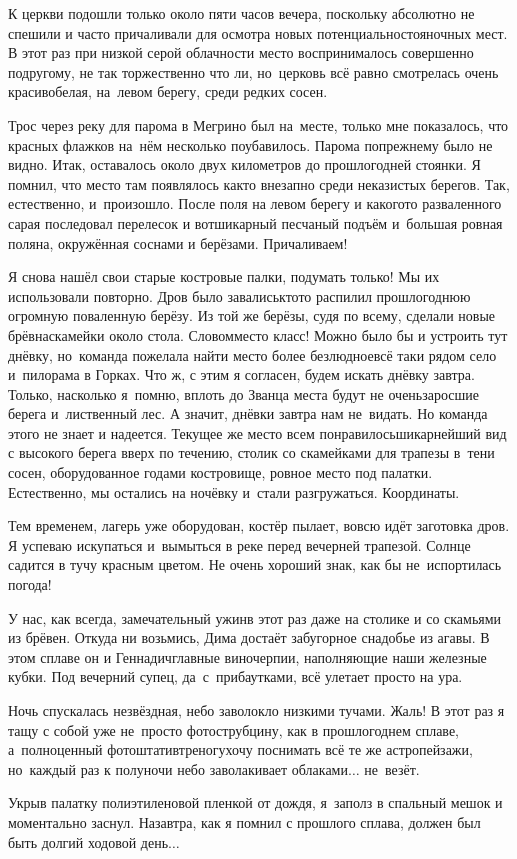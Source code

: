 К церкви подошли только около пяти часов вечера, поскольку абсолютно не спешили и часто причаливали для осмотра новых потенциально\sdash стояночных мест. В этот раз при низкой серой облачности место воспринималось совершенно по\sdash другому, не так торжественно что ли, но~церковь всё равно смотрелась очень красиво\mdash белая, на~левом берегу, среди редких сосен.
 
Трос через реку для парома в Мегрино был на~месте, только мне показалось, что красных флажков на~нём несколько поубавилось. Парома по\sdash прежнему было не видно. Итак, оставалось около двух километров до прошлогодней стоянки. Я помнил, что место там появлялось как\sdash то внезапно среди неказистых берегов. Так, естественно, и~произошло. После поля на левом берегу и какого\sdash то разваленного сарая последовал перелесок и вот\mdash шикарный песчаный подъём и~большая ровная поляна, окружённая соснами и берёзами. Причаливаем! 

Я снова нашёл свои старые костровые палки, подумать только! Мы их использовали повторно. Дров было завались\mdash кто\sdash то распилил прошлогоднюю огромную поваленную берёзу. Из той же берёзы, судя по всему, сделали новые брёвна\sdash скамейки около стола. Словом\mdash место класс! Можно было бы и устроить тут днёвку, но~команда пожелала найти место более безлюдное\mdash всё таки рядом село и~пилорама в Горках. Что ж, с этим я согласен, будем искать днёвку завтра. Только, насколько я~помню, вплоть до Званца места будут не очень\mdash заросшие берега и~лиственный лес. А значит, днёвки завтра нам не~видать. Но команда этого не знает и надеется. Текущее же место всем понравилось\mdash шикарнейший вид с высокого берега вверх по течению, столик со скамейками для трапезы в~тени сосен, оборудованное годами костровище, ровное место под палатки. Естественно, мы остались на ночёвку и~стали разгружаться. Координаты\mdash \CoordsChagodoschaMegrino.

Тем временем, лагерь уже оборудован, костёр пылает, вовсю идёт заготовка дров. Я успеваю искупаться и~вымыться в реке перед вечерней трапезой. Солнце садится в тучу красным цветом. Не очень хороший знак, как бы не~испортилась погода!  

У нас, как всегда, замечательный ужин\mdash в этот раз даже на столике и со скамьями из брёвен. Откуда ни возьмись, Дима достаёт забугорное снадобье из агавы. В этом сплаве он и Геннадич\mdash главные виночерпии, наполняющие наши железные кубки. Под вечерний супец, да~с~прибаутками, всё улетает просто на ура. 

Ночь спускалась незвёздная, небо заволокло низкими тучами. Жаль! В этот раз я тащу с собой уже не~просто фотострубцину, как в прошлогоднем сплаве, а~полноценный фотоштатив\sdash треногу\mdash хочу поснимать всё те же астропейзажи, но~каждый раз к полуночи небо заволакивает облаками$\ldots$ не~везёт.

Укрыв палатку полиэтиленовой пленкой от дождя, я~заполз в спальный мешок и моментально заснул. Назавтра, как я помнил с прошлого сплава, должен был быть долгий ходовой день$\ldots$ 

\begin{center}
\end{center}
